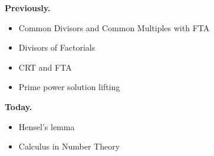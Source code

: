 \documentclass[t]{beamer}
\subtitle{Applications of the Fundamental Theorem of Arithmetic}
\begin{document}
	
\startdoc
\begin{frame}[c]{\insertframenumber}
	\begin{block}{\textbf{Previously.}}
	\begin{itemize}[label=--]
        \item Common Divisors and Common Multiples with FTA 
        \item Divisors of Factorials
        \item CRT and FTA 
        \item Prime power solution lifting
	\end{itemize}
	\end{block}
	\begin{block}{\textbf{Today.}}
		\begin{itemize}[label=--]
            \item Hensel's lemma
            \item Calculus in Number Theory
		\end{itemize}
	\end{block}
\end{frame}

\slide{

}

\end{document}
